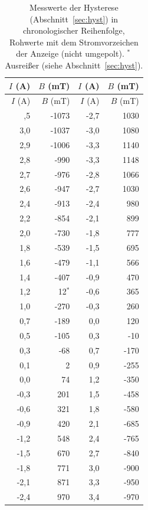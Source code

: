 \begin{longtable}{rr@{\hspace{2cm}}rr}
\caption{Messwerte der Hysterese (Abschnitt~\ref{sec:hyst}) in chronologischer Reihenfolge, Rohwerte mit dem Stromvorzeichen der Anzeige (nicht umgepolt). $^{*}$\,Ausreißer (siehe Abschnitt~\ref{sec:hyst}).}\label{tab:exp3}\\
\toprule
$I$ (A) & $B$ (mT) & $I$ (A) & $B$ (mT) \\
\midrule
\endfirsthead
\toprule
$I$ (A) & $B$ (mT) & $I$ (A) & $B$ (mT) \\
\midrule
\endhead
\bottomrule
\endfoot
3,5 & -1073 & -2,7 & 1030 \\
3,0 & -1037 & -3,0 & 1080 \\
2,9 & -1006 & -3,3 & 1140 \\
2,8 & -990 & -3,3 & 1148 \\
2,7 & -976 & -2,8 & 1066 \\
2,6 & -947 & -2,7 & 1030 \\
2,4 & -913 & -2,4 & 980 \\
2,2 & -854 & -2,1 & 899 \\
2,0 & -730 & -1,8 & 777 \\
1,8 & -539 & -1,5 & 695 \\
1,6 & -479 & -1,1 & 566 \\
1,4 & -407 & -0,9 & 470 \\
1,2 & 12$^{*}$ & -0,6 & 365 \\
1,0 & -270 & -0,3 & 260 \\
0,7 & -189 & 0,0 & 120 \\
0,5 & -105 & 0,3 & -10 \\
0,3 & -68 & 0,7 & -170 \\
0,1 & 2 & 0,9 & -255 \\
0,0 & 74 & 1,2 & -350 \\
-0,3 & 201 & 1,5 & -458 \\
-0,6 & 321 & 1,8 & -580 \\
-0,9 & 420 & 2,1 & -685 \\
-1,2 & 548 & 2,4 & -765 \\
-1,5 & 670 & 2,7 & -840 \\
-1,8 & 771 & 3,0 & -900 \\
-2,1 & 871 & 3,3 & -950 \\
-2,4 & 970 & 3,4 & -970 \\
\end{longtable}
